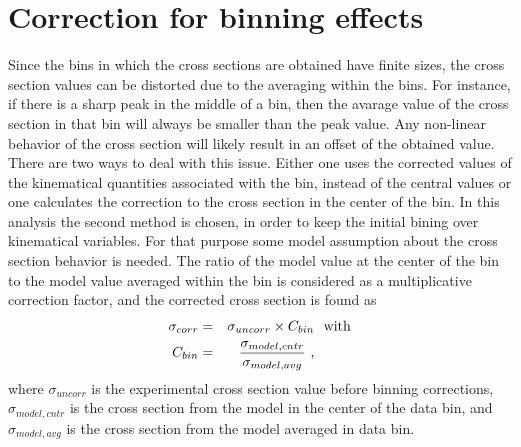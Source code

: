 \chapter{Correction for binning effects}

Since the bins in which the cross sections are obtained have finite sizes, the cross section values can be distorted due to the averaging within the bins.  For instance, if there is a sharp peak in the middle of a bin, then the avarage value of the cross section in that bin will always be smaller than the peak value. Any non-linear behavior of the cross section will likely result in an offset of the obtained
value. There are two ways to deal with this issue. Either one uses the corrected values of the kinematical quantities associated with the bin, instead of the central values or one calculates the correction to the  cross section in the center of the bin. In this analysis the second method is chosen,
in order to keep the initial bining over kinematical variables. For that purpose some model assumption about the cross section behavior is needed. The ratio of
the model value at the center of the bin  to
the model value averaged within the bin is considered as a
multiplicative correction factor, and the
corrected cross section is found as
\begin{equation}
\begin{aligned}
\sigma_{corr} & = &\sigma_{uncorr} \times
C_{bin} & \text{ \,\,with}\\
\label{eq:bincor}
C_{bin} & = &\frac{\sigma_{model,cntr}}{\sigma_{model,avg}} \textrm{ ,}
\end{aligned}  
\end{equation}
where $\sigma_{uncorr}$ is the experimental
cross section value before binning
corrections, $\sigma_{model,cntr}$ is the cross
section from the model
in the center
of the data bin, and
$\sigma_{model,avg}$ is the cross
section from the model averaged in data bin.


